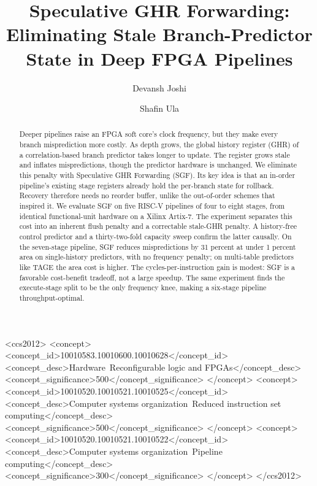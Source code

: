 \documentclass[acmsmall,nonacm,screen]{acmart}
\begin{document}
\title{Speculative GHR Forwarding: Eliminating Stale Branch-Predictor State in Deep FPGA Pipelines}

\author{Devansh Joshi}

\author{Shafin Ula}

\begin{abstract}
Deeper pipelines raise an FPGA soft core's clock frequency, but they make every branch misprediction more costly. As depth grows, the global history register (GHR) of a correlation-based branch predictor takes longer to update. The register grows stale and inflates mispredictions, though the predictor hardware is unchanged. We eliminate this penalty with Speculative GHR Forwarding (SGF). Its key idea is that an in-order pipeline's existing stage registers already hold the per-branch state for rollback. Recovery therefore needs no reorder buffer, unlike the out-of-order schemes that inspired it. We evaluate SGF on five RISC-V pipelines of four to eight stages, from identical functional-unit hardware on a Xilinx Artix-7. The experiment separates this cost into an inherent flush penalty and a correctable stale-GHR penalty. A history-free control predictor and a thirty-two-fold capacity sweep confirm the latter causally. On the seven-stage pipeline, SGF reduces mispredictions by 31 percent at under 1 percent area on single-history predictors, with no frequency penalty; on multi-table predictors like TAGE the area cost is higher. The cycles-per-instruction gain is modest: SGF is a favorable cost-benefit tradeoff, not a large speedup. The same experiment finds the execute-stage split to be the only frequency knee, making a six-stage pipeline throughput-optimal.
\end{abstract}

\begin{CCSXML}
<ccs2012>
<concept>
<concept_id>10010583.10010600.10010628</concept_id>
<concept_desc>Hardware~Reconfigurable logic and FPGAs</concept_desc>
<concept_significance>500</concept_significance>
</concept>
<concept>
<concept_id>10010520.10010521.10010525</concept_id>
<concept_desc>Computer systems organization~Reduced instruction set computing</concept_desc>
<concept_significance>500</concept_significance>
</concept>
<concept>
<concept_id>10010520.10010521.10010522</concept_id>
<concept_desc>Computer systems organization~Pipeline computing</concept_desc>
<concept_significance>300</concept_significance>
</concept>
</ccs2012>
\end{CCSXML}
\end{document}
